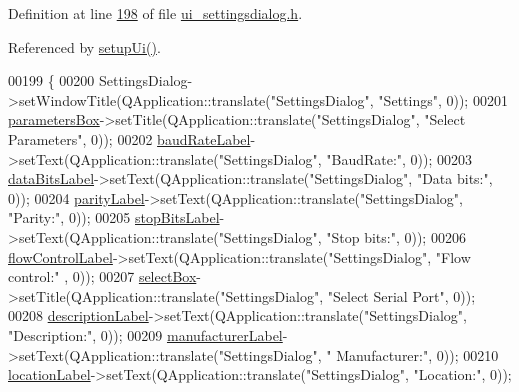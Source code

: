 Definition at line \hyperlink{a00141_source_l00198}{198} of file \hyperlink{a00141_source}{ui\+\_\+settingsdialog.\+h}.



Referenced by \hyperlink{a00141_source_l00061}{setup\+Ui()}.


\begin{DoxyCode}
00199     \{
00200         SettingsDialog->setWindowTitle(QApplication::translate(\textcolor{stringliteral}{"SettingsDialog"}, \textcolor{stringliteral}{"Settings"}, 0));
00201         \hyperlink{a00082_a47cebbe70a990bd1f309250101022889}{parametersBox}->setTitle(QApplication::translate(\textcolor{stringliteral}{"SettingsDialog"}, \textcolor{stringliteral}{"Select Parameters"},
       0));
00202         \hyperlink{a00082_a57e59712bae4f482b1ff1d61c81471e8}{baudRateLabel}->setText(QApplication::translate(\textcolor{stringliteral}{"SettingsDialog"}, \textcolor{stringliteral}{"BaudRate:"}, 0));
00203         \hyperlink{a00082_a4d827d5f217aa166e228b0e2c9c5aaf7}{dataBitsLabel}->setText(QApplication::translate(\textcolor{stringliteral}{"SettingsDialog"}, \textcolor{stringliteral}{"Data bits:"}, 0));
00204         \hyperlink{a00082_ae062846ca8db471d7eb362ae39123422}{parityLabel}->setText(QApplication::translate(\textcolor{stringliteral}{"SettingsDialog"}, \textcolor{stringliteral}{"Parity:"}, 0));
00205         \hyperlink{a00082_a665748b39dda24475690e2363b72e265}{stopBitsLabel}->setText(QApplication::translate(\textcolor{stringliteral}{"SettingsDialog"}, \textcolor{stringliteral}{"Stop bits:"}, 0));
00206         \hyperlink{a00082_a7876a6baf43bd21d3b816f6a5a24fffc}{flowControlLabel}->setText(QApplication::translate(\textcolor{stringliteral}{"SettingsDialog"}, \textcolor{stringliteral}{"Flow control:"}
      , 0));
00207         \hyperlink{a00082_aea3871481f7ecb94f1835e519631f9a2}{selectBox}->setTitle(QApplication::translate(\textcolor{stringliteral}{"SettingsDialog"}, \textcolor{stringliteral}{"Select Serial Port"}, 0));
00208         \hyperlink{a00082_aaf2756662f744e79aa3443f1e035870d}{descriptionLabel}->setText(QApplication::translate(\textcolor{stringliteral}{"SettingsDialog"}, \textcolor{stringliteral}{"Description:"},
       0));
00209         \hyperlink{a00082_afeadc7657c9eaa3103bd529342f5fe97}{manufacturerLabel}->setText(QApplication::translate(\textcolor{stringliteral}{"SettingsDialog"}, \textcolor{stringliteral}{"
      Manufacturer:"}, 0));
00210         \hyperlink{a00082_ad860892f11a79cb726643d3478078fcd}{locationLabel}->setText(QApplication::translate(\textcolor{stringliteral}{"SettingsDialog"}, \textcolor{stringliteral}{"Location:"}, 0));

\end{DoxyCode}
